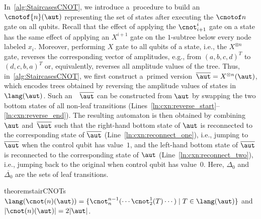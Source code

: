 \figGHZ %

 In~\cref{alg:StaircasesCNOT}, we introduce a~procedure to
build an \lsta $\cnotof{n}(\aut)$
representing the set of states after executing the $\cnotof n$ gate on all
qubits.
Recall that the effect of applying the $\cnot^{i}_{i+1}$ gate on a state has the same effect of applying an $X^{i+1}$ gate on the $1$-subtree below every node labeled $x_i$.
Moreover, performing $X$ gate to all qubits of a state, i.e., the $X^{\otimes
n}$ gate, reverses the corresponding vector of amplitudes, e.g., from
$(a,b,c,d)^T$ to $(d,c,b,a)^T$ or, equivalently, reverses all amplitude values of the tree.
Thus, in~\cref{alg:StaircasesCNOT}, we first construct a~primed
version~$\overline \aut = X^{\otimes n}(\aut)$, which encodes trees obtained by reversing the amplitude values of states in $\lang(\aut)$. 
Such an~\lsta~$\overline \aut$ can be constructed from $\aut$ by swapping the two bottom
states of all non-leaf transitions (Lines~\ref{ln:cxn:reverse_start}--\ref{ln:cxn:reverse_end}). 
The resulting automaton is then obtained by combining~$\aut$ and~$\overline \aut$ such
that the right-hand bottom state of $\aut$ is reconnected to the corresponding state
of $\overline \aut$ (Line~\ref{ln:cxn:reconnect_one}), i.e., jumping to
$\overline \aut$ when the
control qubit has value~$1$, and the left-hand bottom state of $\overline \aut$ is reconnected
to the corresponding state of $\aut$ (Line~\ref{ln:cxn:reconnect_two}), i.e.,
jumping back to the original \lsta when control qubit has value~$0$. Here, $\Delta_0$ and $\overline{\Delta_0}$ are the sets of leaf transitions.



{\small
 \begin{restatable}{theorem}{stairCNOTs}\label{thm:stairCNOTs} 
$\lang( \cnot(n)(\aut) )  = \{\cnot^{n-1}_n(\cdots \cnot^1_2 (T)\cdots ) \mid  T\in \lang(\aut) \}
$
and $|\cnot(n)(\aut)|=2|\aut|$.
 \end{restatable}
}



